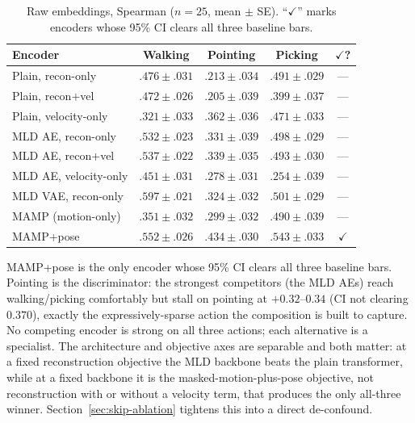 \documentclass[letterpaper]{article} %
\begin{document}
\begin{table}[h]
\centering
\caption{Raw embeddings, Spearman ($n=25$, mean $\pm$ SE). ``$\checkmark$'' marks encoders whose
95\% CI clears all three baseline bars.}
\setlength{\tabcolsep}{2pt}
\small
\begin{tabular}{lcccc}
\toprule
Encoder & Walking & Pointing & Picking & $\checkmark$? \\
\midrule
Plain, recon-only    & $.476{\scriptstyle\pm}.031$ & $.213{\scriptstyle\pm}.034$ & $.491{\scriptstyle\pm}.029$ & --- \\
Plain, recon$+$vel   & $.472{\scriptstyle\pm}.026$ & $.205{\scriptstyle\pm}.039$ & $.399{\scriptstyle\pm}.037$ & --- \\
Plain, velocity-only & $.321{\scriptstyle\pm}.033$ & $.362{\scriptstyle\pm}.036$ & $.471{\scriptstyle\pm}.033$ & --- \\
MLD AE, recon-only   & $.532{\scriptstyle\pm}.023$ & $.331{\scriptstyle\pm}.039$ & $.498{\scriptstyle\pm}.029$ & --- \\
MLD AE, recon$+$vel  & $.537{\scriptstyle\pm}.022$ & $.339{\scriptstyle\pm}.035$ & $.493{\scriptstyle\pm}.030$ & --- \\
MLD AE, velocity-only& $.451{\scriptstyle\pm}.031$ & $.278{\scriptstyle\pm}.031$ & $.254{\scriptstyle\pm}.039$ & --- \\
MLD VAE, recon-only  & $.597{\scriptstyle\pm}.021$ & $.324{\scriptstyle\pm}.032$ & $.501{\scriptstyle\pm}.029$ & --- \\
MAMP (motion-only)   & $.351{\scriptstyle\pm}.032$ & $.299{\scriptstyle\pm}.032$ & $.490{\scriptstyle\pm}.039$ & --- \\
{MAMP+pose}   & $\mathbf{.552{\scriptstyle\pm}.026}$ & $\mathbf{.434{\scriptstyle\pm}.030}$ & $\mathbf{.543{\scriptstyle\pm}.033}$ & $\checkmark$ \\
\bottomrule
\end{tabular}
\end{table}

{MAMP+pose is the only encoder whose 95\% CI clears all three baseline bars.} Pointing is
the discriminator: the strongest competitors (the MLD AEs) reach walking/picking comfortably but
stall on pointing at $+0.32$--$0.34$ (CI not clearing $0.370$), exactly the expressively-sparse
action the composition is built to capture. No competing encoder is strong on all three actions;
each alternative is a specialist. The architecture and objective axes are separable and both
matter: at a fixed reconstruction objective the MLD backbone beats the plain transformer, while at
a fixed backbone it is the masked-motion-plus-pose objective, not reconstruction with or without a
velocity term, that produces the only all-three winner. Section~\ref{sec:skip-ablation} tightens this into a direct
de-confound.
\end{document}
